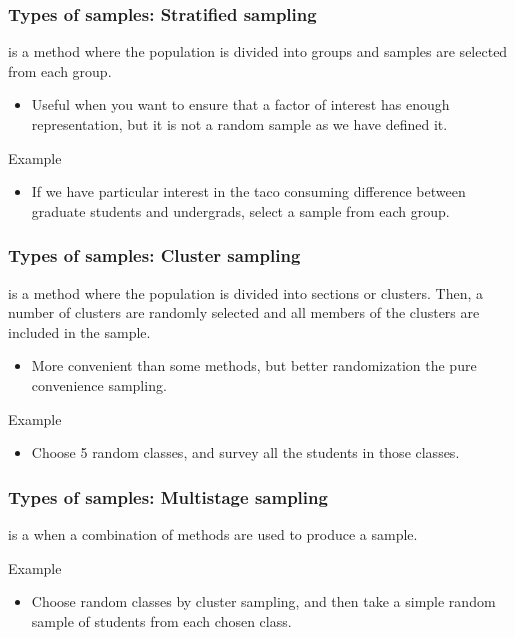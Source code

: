 \documentclass[xcolor=table, handout]{beamer}
\begin{document}
\begin{frame}
\frametitle{Types of samples: Stratified sampling}

\begin{block}{}
\large {} is a method where the population is divided into groups and samples are selected from each group.
\begin{itemize}
\item Useful when you want to ensure that a factor of interest has enough representation, but it is not a random sample as we have defined it.
\end{itemize}
\end{block}
\pause
\begin{exampleblock}{Example}
\begin{itemize}
\item If we have particular interest in the taco consuming difference between graduate students and undergrads, select a sample from each group.
\end{itemize}
\end{exampleblock}
\end{frame}

\begin{frame}
\frametitle{Types of samples: Cluster sampling}

\begin{block}{}
\large {} is a method where the population is divided into sections or clusters. Then, a number of clusters are randomly selected and all members of the clusters are included in the sample.
\begin{itemize}
\item More convenient than some methods, but better randomization the pure convenience sampling.
\end{itemize}
\end{block}
\pause
\begin{exampleblock}{Example}
\begin{itemize}
\item Choose 5 random classes, and survey all the students in those classes.
\end{itemize}
\end{exampleblock}
\end{frame}

\begin{frame}
\frametitle{Types of samples: Multistage sampling}

\begin{block}{}
\large {} is a when a combination of methods are used to produce a sample.
\end{block}
\pause
\begin{exampleblock}{Example}
\begin{itemize}
\item Choose random classes by cluster sampling, and then take a simple random sample of students from each chosen class.  
\end{itemize}
\end{exampleblock}
\end{frame}
\end{document}
